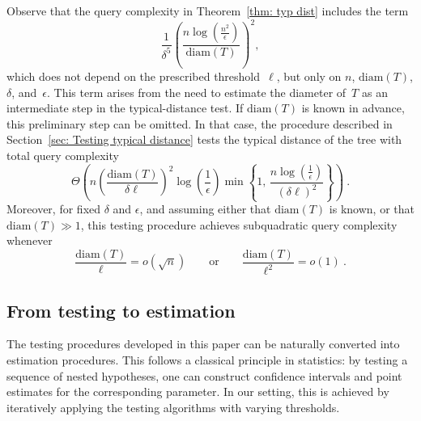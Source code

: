 \documentclass[12pt]{article}
\newcommand{\diam}[1]{\mathrm{diam}\!\left(#1\right)}
\begin{document}
\noindent Observe that the query complexity in Theorem~\ref{thm: typ dist} includes the term
\[
\frac{1}{\delta^5}\left(\frac{n\log(\frac{n^2}{\epsilon})}{\diam{T}}\right)^2,
\]
which does not depend on the prescribed threshold~$\ell$, but only on $n$, $\diam{T}$, $\delta$, and~$\epsilon$.
This term arises from the need to estimate the diameter of~$T$ as an intermediate step in the typical-distance test.
If $\diam{T}$ is known in advance, this preliminary step can be omitted.
In that case, the procedure described in Section~\ref{sec: Testing typical distance} tests the typical distance of the tree with total query complexity
\[
\Theta\!\left(
n\left(\frac{\diam{T}}{\delta\ell}\right)^2
\log\!\left(\frac{1}{\epsilon}\right)
\min\left\{
1,\,
\frac{n\log(\frac{1}{\epsilon})}{(\delta \ell)^2}
\right\}
\right)~.
\]
\noindent Moreover, for fixed $\delta$ and $\epsilon$, and assuming either that $\diam{T}$ is known, or that $\diam{T}\gg 1$, this testing procedure achieves subquadratic query complexity whenever
\[
\frac{\diam{T}}{\ell} = o(\sqrt{n})
\qquad\text{or}\qquad
\frac{\diam{T}}{\ell^2} = o(1)~.
\]


\subsection{From testing to estimation}

The testing procedures developed in this paper can be naturally converted into estimation procedures.
This follows a classical principle in statistics: by testing a sequence of nested hypotheses, one can construct confidence intervals and point estimates for the corresponding parameter.
In our setting, this is achieved by iteratively applying the testing algorithms with varying thresholds.
\end{document}
